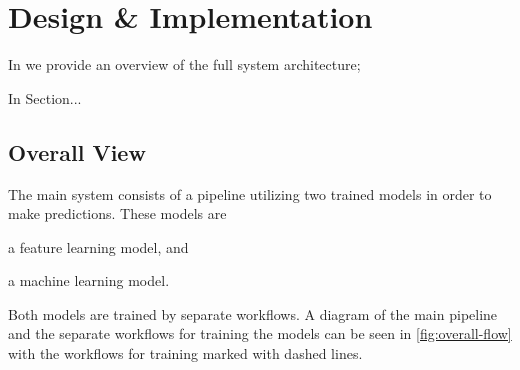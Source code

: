 \chapter{Design \& Implementation}\label{chap:design}

\begin{chapterorganization}
  \item In  we provide an overview of the full system architecture;
  \item In Section...
\end{chapterorganization}

\section{Overall View}
The main system consists of a pipeline utilizing two trained models in order to make predictions. These models are
\begin{enumerate*}[label=(\roman*)]
  \item a feature learning model, and
  \item a machine learning model.
\end{enumerate*}
Both models are trained by separate workflows. A diagram of the main pipeline and the separate workflows for training the models can be seen in \cref{fig:overall-flow} with the workflows for training marked with dashed lines.

